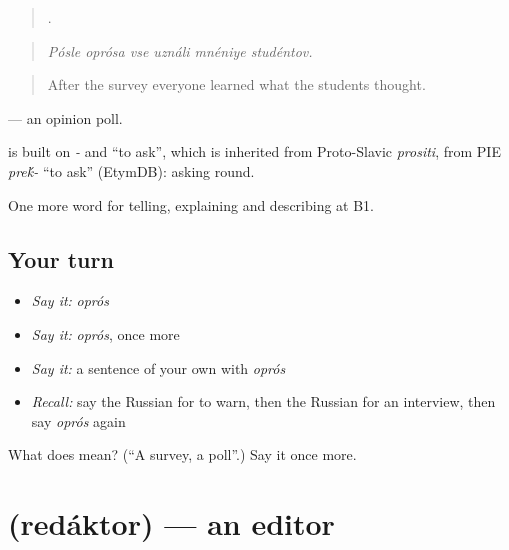 \begin{quote}
     .
\end{quote}

\begin{quote}
\emph{Pósle oprósa vse uználi mnéniye studéntov.}
\end{quote}

\begin{quote}
After the survey everyone learned what the students thought.
\end{quote}

\emph{  } — an opinion poll.

\begin{cousinweb}
\emph{} is built on \emph{-} and \emph{} \textquotedblleft{}to ask\textquotedblright{}, which is inherited from Proto-Slavic \emph{prositi}, from PIE \emph{pre\'{k}-} \textquotedblleft{}to ask\textquotedblright{} (EtymDB): asking round.
\end{cousinweb}

\begin{grammarlens}[title={What you've built}]
One more word for telling, explaining and describing at B1.
\end{grammarlens}

\subsection*{Your turn}
\begin{itemize}
\raggedright
  \item \emph{Say it:} \emph{oprós}
  \item \emph{Say it:} \emph{oprós}, once more
  \item \emph{Say it:} a sentence of your own with \emph{oprós}
  \item \emph{Recall:} say the Russian for to warn, then the Russian for an interview, then say \emph{oprós} again
\end{itemize}

\begin{tcolorbox}[breakable,colback=teal!4,colframe=teal!35!black,title={Before you move on}]
What does  mean? (\textquotedblleft{}A survey, a poll\textquotedblright{}.) Say it once more.
\end{tcolorbox}
\section[\texorpdfstring{\ru{редактор} (redáktor)}{редактор (redáktor)}]{ (redáktor) — an editor}

